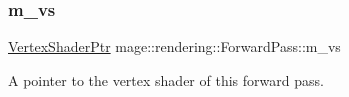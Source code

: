 \subsubsection{\texorpdfstring{m\+\_\+vs}{m\_vs}}
{\footnotesize\ttfamily \hyperlink{namespacemage_1_1rendering_aaf704b9c54a4181f4950a1761de69dda}{Vertex\+Shader\+Ptr} mage\+::rendering\+::\+Forward\+Pass\+::m\+\_\+vs\hspace{0.3cm}{\ttfamily [private]}}

A pointer to the vertex shader of this forward pass. 